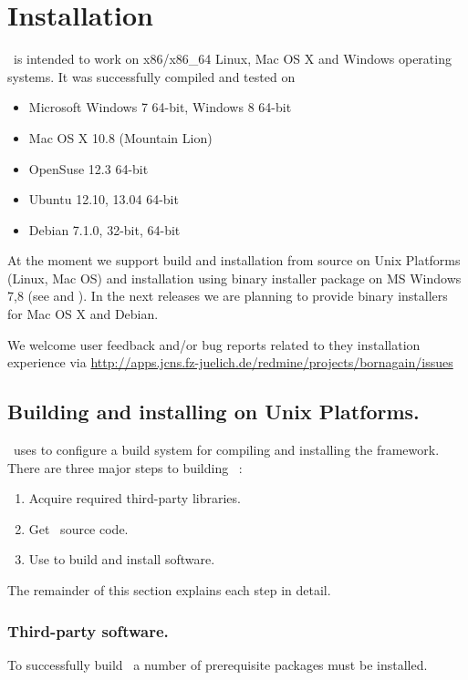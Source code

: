 \newpage
\chapter{Installation} 

\BornAgain\ is intended to work on x86/x86\_64 Linux, Mac OS X and Windows operating systems. It was successfully compiled and tested on
\begin{itemize}
\item Microsoft Windows 7 64-bit, Windows 8 64-bit
\item Mac OS X 10.8 (Mountain Lion)
\item OpenSuse 12.3 64-bit
\item Ubuntu 12.10, 13.04 64-bit
\item Debian 7.1.0, 32-bit, 64-bit
\end{itemize}

At the moment we support build and installation from source on Unix Platforms 
(Linux, Mac OS) and
installation using binary installer package on MS Windows 7,8 (see
 and ).
In the next releases we are planning to provide binary installers for 
Mac OS X and Debian.

We welcome user feedback and/or bug reports related to they installation experience
via \url{http://apps.jcns.fz-juelich.de/redmine/projects/bornagain/issues}


\section{Building and installing on Unix Platforms.} 


\BornAgain\ uses  to configure a build system for compiling and installing the framework. There are three major steps to building \BornAgain\ :
\begin{enumerate}[1.]
\item Acquire required third-party libraries.
\item Get \BornAgain\ source code.
\item Use  to build and install software.
\end{enumerate}
The remainder of this section explains each step in detail.

\subsection{Third-party software.}
To successfully build \BornAgain\ a number of prerequisite packages must be installed.

